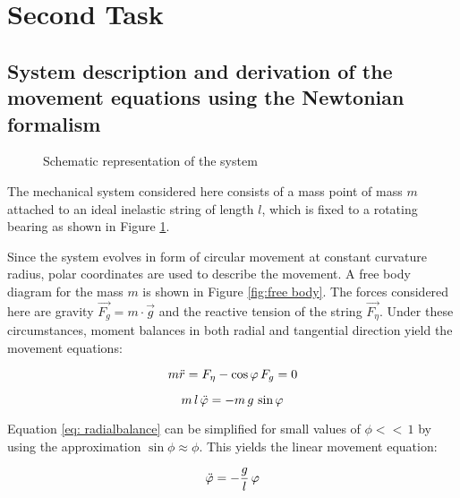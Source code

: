\documentclass[12pt,bibstyle=none,pagenumberinfooter]{ifmdocument}
\begin{document}
\section{Second Task}

\subsection{System description and derivation of the movement equations using the Newtonian formalism}
\label{sec: NewtonianDerivation}


\begin{figure}[h]
    \centering
    \def\svgwidth{0.4\textwidth}
    
    \caption{Schematic representation of the system}
    \label{fig:skizze}
\end{figure}



The mechanical system considered here consists of a mass point of mass $m$ attached to an ideal inelastic string of length $l$, which is fixed to a rotating bearing as shown in Figure \ref{fig:skizze}.


Since the system evolves in form of circular movement at constant curvature radius, polar coordinates are used to describe the movement. A free body diagram for the mass $m$ is shown in Figure \ref{fig:free body}. The forces considered here are gravity $\Vec{F_g} = m\cdot \Vec{g}$ and the reactive tension of the string $\Vec{F_{\eta}}$. Under these circumstances, moment balances in both radial and tangential direction yield the movement equations:

\begin{equation}
\label{eq: radialbalance}
    m \Ddot{r} = F_{\eta} - \cos{\phi}\,F_g = 0
\end{equation}

\begin{equation}
\label{eq: tangentialbalance}
    m\, l \, \Ddot{\phi} = -m\, g \,\sin{\phi}
\end{equation}

Equation \ref{eq: radialbalance} can be simplified for small values of $\phi <<\, 1$ by using the approximation $\sin{\phi} \approx \phi $. This yields the linear movement equation:

\begin{equation}
    \Ddot{\phi} = -\frac{g}{l}\,\phi
\end{equation}
\end{document}
